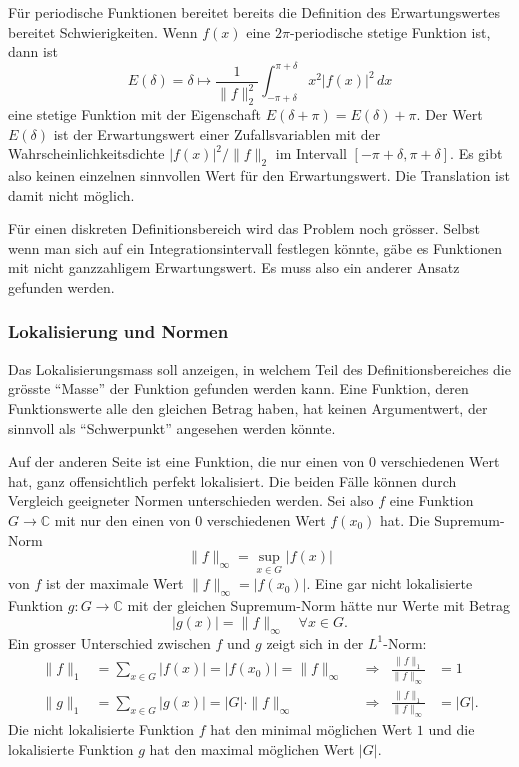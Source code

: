 Für periodische Funktionen bereitet bereits die Definition
des Erwartungswertes bereitet Schwierigkeiten.
Wenn $f(x)$ eine $2\pi$-periodische stetige Funktion ist, dann ist
\[
E(\delta)
=
\delta\mapsto 
\frac{1}{\|f\|_2^2}
\int_{-\pi+\delta}^{\pi+\delta}
x^2
|f(x)|^2
\,dx
\]
eine stetige Funktion mit der Eigenschaft $E(\delta+\pi)=E(\delta)+\pi$.
Der Wert $E(\delta)$ ist der Erwartungswert einer Zufallsvariablen
mit der Wahrscheinlichkeitsdichte $|f(x)|^2/\|f\|_2$ im Intervall
$[-\pi+\delta,\pi+\delta]$.
Es gibt also keinen einzelnen sinnvollen Wert für den Erwartungswert.
Die Translation ist damit nicht möglich.

Für einen diskreten Definitionsbereich wird das Problem noch grösser.
Selbst wenn man sich auf ein Integrationsintervall festlegen könnte,
gäbe es Funktionen mit nicht ganzzahligem Erwartungswert.
Es muss also ein anderer Ansatz gefunden werden.

%
%
\subsubsection{Lokalisierung und Normen}
Das Lokalisierungsmass soll anzeigen, in welchem Teil des Definitionsbereiches
die grösste ``Masse'' der Funktion gefunden werden kann.
Eine Funktion, deren Funktionswerte alle den gleichen Betrag
haben, hat keinen Argumentwert, der sinnvoll als ``Schwerpunkt''
angesehen werden könnte.

Auf der anderen Seite ist eine Funktion, die nur einen von $0$
verschiedenen Wert hat, ganz offensichtlich perfekt lokalisiert.
Die beiden Fälle können durch Vergleich geeigneter Normen 
unterschieden werden.
Sei also $f$ eine Funktion $G\to\mathbb{C}$ mit nur den einen von $0$
verschiedenen Wert $f(x_0)$ hat.
Die Supremum-Norm
\[
\|f\|_\infty
=
\sup_{x\in G} |f(x)|
\]
von $f$ ist der maximale Wert $\|f\|_\infty = |f(x_0)|$.
Eine gar nicht lokalisierte Funktion $g\colon G\to\mathbb{C}$
mit der gleichen Supremum-Norm hätte nur Werte mit Betrag
\[
|g(x)|
=
\|f\|_\infty\quad \forall x\in G.
\]
Ein grosser Unterschied zwischen $f$ und $g$ zeigt sich in
der $L^1$-Norm:
\begin{align*}
\|f\|_1
&=
\sum_{x\in G} |f(x)|
=
|f(x_0)|
=
\|f\|_\infty
&&\Rightarrow& \frac{\|f\|_1}{\|f\|_\infty}&=1
\\
\|g\|_1
&=
\sum_{x\in G} |g(x)|
=
|G|\cdot \|f\|_\infty
&&\Rightarrow& \frac{\|f\|_1}{\|f\|_\infty}&=|G|.
\end{align*}
Die nicht lokalisierte Funktion $f$ hat den minimal 
möglichen Wert $1$ und die lokalisierte Funktion $g$
hat den maximal möglichen Wert $|G|$.

